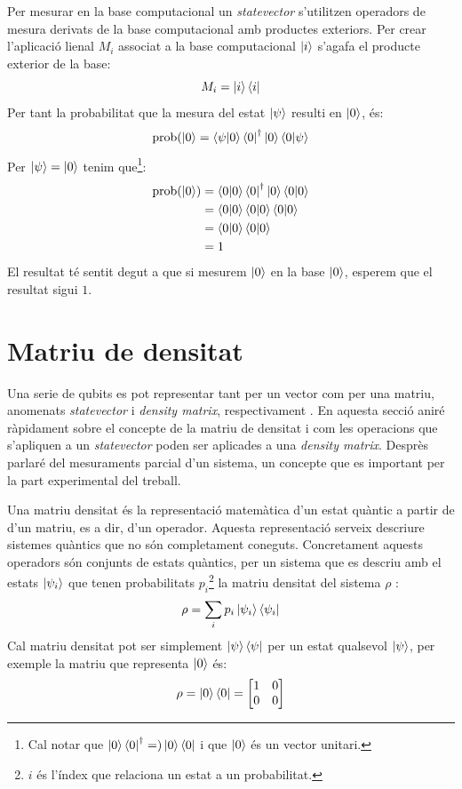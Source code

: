 Per mesurar en la base computacional un \textit{statevector} s'utilitzen operadors de mesura derivats de la base computacional amb productes exteriors. Per crear l'aplicació lienal ${M_i}$ associat a la base computacional $\ket{i}$ s'agafa el producte exterior de la base:
$$
M_i = \ket{i}\bra{i}
$$
Per tant la probabilitat que la mesura del estat $\ket{\psi}$ resulti en $\ket{0}$, és:
$$
\mathrm{prob}(\ket{0} = \bra{\psi}\ket{0}\bra{0}^\dagger \ket{0}\bra{0}\ket{\psi}
$$
Per $\ket{\psi} = \ket{0}$ tenim que\footnote{Cal notar que $\ket{0}\bra{0}^\dagger =) \ket{0}\bra{0}$ i que $\ket{0}$ és un vector unitari.}:
\begin{align*}
	\mathrm{prob}(\ket{0}) &= \bra{0}\ket{0}\bra{0}^\dagger \ket{0}\bra{0}\ket{0} \\
	&= \bra{0}\ket{0}\bra{0} \ket{0}\bra{0}\ket{0} \\
	&= \bra{0}\ket{0}\bra{0}\ket{0} \\
	&= 1
\end{align*}
El resultat té sentit degut a que si mesurem $\ket{0}$ en la base $\ket{0}$, esperem que el resultat sigui $1$. 

\section{Matriu de densitat}
Una serie de qubits es pot representar tant per un vector com per una matriu, anomenats \textit{statevector} i \textit{density matrix}, respectivament \cite{QCandQI}.
En aquesta secció aniré ràpidament sobre el concepte de la matriu de densitat i com les operacions que s'apliquen a un \textit{statevector} poden ser aplicades a una \textit{density matrix}. Desprès parlaré del mesuraments parcial d'un sistema, un concepte que es important per la part experimental del treball. 

Una matriu densitat és la representació matemàtica d'un estat quàntic a partir de d'un matriu, es a dir, d'un operador. Aquesta representació serveix descriure sistemes quàntics que no són completament coneguts. Concretament aquests operadors són conjunts de estats quàntics, per un sistema que es descriu amb el estats $\ket{\psi_i}$ que tenen probabilitats $p_i$\footnote{$i$ és l'índex que relaciona un estat a un probabilitat.} la matriu densitat del sistema $\rho$ \cite{QCandQI:density_matrix}:
$$
\rho = \sum_i p_i\ket{\psi_i}\bra{\psi_i}
$$
Cal matriu densitat pot ser simplement $\ket{\psi}\bra{\psi}$ per un estat qualsevol $\ket{\psi}$, per exemple la matriu que representa $\ket{0}$ és:
$$
\rho = \ket{0}\bra{0} = \begin{bmatrix}
	1 & 0 \\
	0 & 0 
\end{bmatrix}
$$

